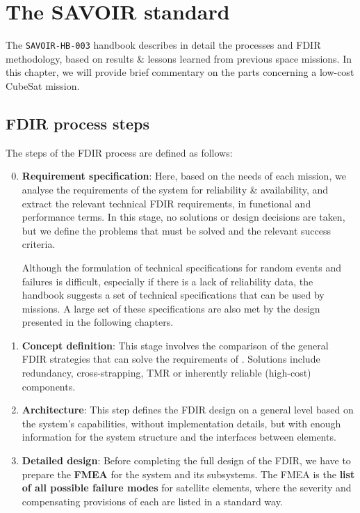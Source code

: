 \documentclass[a4paper,nobib,final]{tufte-book}
\begin{document}
\section{The SAVOIR standard}
The \texttt{SAVOIR-HB-003} handbook describes in detail the processes and \acs{FDIR} methodology, based on results \& lessons learned from previous space missions. In this chapter, we will provide brief commentary on the parts concerning a low-cost CubeSat mission.

\subsection{\acs{FDIR} process steps}
\bgroup
{}

The steps of the \acs{FDIR} process are defined as follows:
\begin{enumerate}
	\setcounter{enumi}{-1}
	\item \textbf{Requirement specification}: Here, based on the needs of each mission, we analyse the requirements of the system for reliability \& availability, and extract the relevant technical \acs{FDIR} requirements, in functional and performance terms. In this stage, no solutions or design decisions are taken, but we define the problems that must be solved and the relevant success criteria.
	\label{itm:fdir_reqs}

	
	Although the formulation of technical specifications for random events and failures is difficult, especially if there is a lack of reliability data, the handbook suggests a set of technical specifications \autocite[42]{SAVOIR-HB-003} that can be used by missions. A large set of these specifications are also met by the design presented in the following chapters.
	
	\item \textbf{Concept definition}: This stage involves the comparison of the general \acs{FDIR} strategies that can solve the requirements of . Solutions include redundancy, cross-strapping, \acl{TMR} or inherently reliable (high-cost) components.
	
	
	\label{itm:fdir_concept}

	\item \textbf{Architecture}: This step defines the \acs{FDIR} design on a general level based on the system's capabilities, without implementation details, but with enough information for the system structure and the interfaces between elements.
	
	\item \textbf{Detailed design}: Before completing the full design of the \acs{FDIR}, we have to prepare the \textbf{\acf{FMEA}} \autocite{carlson_effective_fmeas_2012} for the system and its subsystems. The \acs{FMEA} is the \textbf{list of all possible failure modes} for satellite elements, where the severity and compensating provisions of each are listed in a standard way.
	

\end{enumerate}
\end{document}
